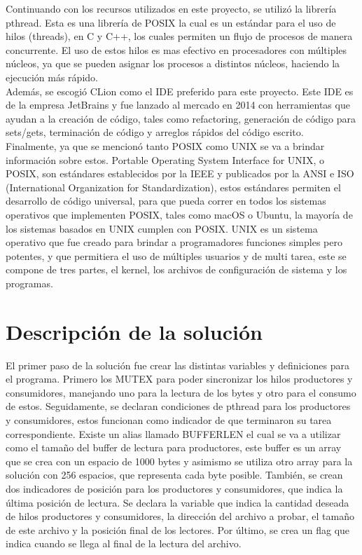 \documentclass[10pt, article, natbib]{IEEEtran}
\begin{document}
Continuando con los recursos utilizados en este proyecto, se utilizó la librería pthread. Esta es una librería de POSIX la cual es un estándar para el uso de hilos (threads), en C y C++, los cuales permiten un flujo de procesos de manera concurrente. El uso de estos hilos es mas efectivo en procesadores con múltiples núcleos, ya que se pueden asignar los procesos a distintos núcleos, haciendo la ejecución más rápido.\cite{ippolito_2020_linux}\\

Además, se escogió CLion como el IDE preferido para este proyecto. Este IDE es de la empresa JetBrains y fue lanzado al mercado en 2014\cite{avram_2014_jetbrains} con herramientas que ayudan a la creación de código, tales como refactoring, generación de código para sets/gets, terminación de código y arreglos rápidos del código escrito.\cite{jetbrains_intelligent}\\

Finalmente, ya que se mencionó tanto POSIX como UNIX se va a brindar información sobre estos. Portable Operating System Interface for UNIX, o POSIX, son estándares establecidos por la IEEE y publicados por la ANSI e ISO (International Organization for Standardization), estos estándares permiten el desarrollo de código universal, para que pueda correr en todos los sistemas operativos que implementen POSIX, tales como macOS o Ubuntu, la mayoría de los sistemas basados en UNIX cumplen con POSIX.\cite{universityinformationtechnologyservices_2021_about} UNIX es un sistema operativo que fue creado para brindar a programadores funciones simples pero potentes, y que permitiera el uso de múltiples usuarios y de multi tarea, este se compone de tres partes, el kernel, los archivos de configuración de sistema y los programas.\cite{idahostateuniversity_1997_what}

\section{Descripción de la solución}
El primer paso de la solución fue crear las distintas variables y definiciones para el programa. Primero los MUTEX para poder sincronizar los hilos productores y consumidores, manejando uno para la lectura de los bytes y otro para el consumo de estos.\cite{whiletruethendream_2020_mutex} \cite{cppdev_2010_c} \cite{manrow_2011_c} Seguidamente, se declaran condiciones de pthread para los productores y consumidores, estos funcionan como indicador de que terminaron su tarea correspondiente.\cite{theopengroup_1997_pthread_cond_wait} Existe un alias llamado BUFFERLEN el cual se va a utilizar como el tamaño del buffer de lectura para productores, este buffer es un array que se crea con un espacio de 1000 bytes y asimismo se utiliza otro array para la solución con 256 espacios, que representa cada byte posible. También, se crean dos indicadores de posición para los productores y consumidores, que indica la última posición de lectura. Se declara la variable que indica la cantidad deseada de hilos productores y consumidores, la dirección del archivo a probar, el tamaño de este archivo y la posición final de los lectores. Por último, se crea un flag que indica cuando se llega al final de la lectura del archivo.\\
\end{document}
